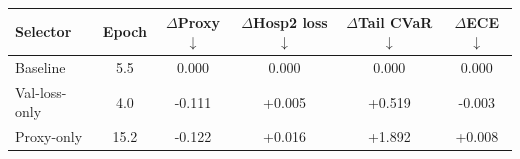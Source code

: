 \begin{tabular}{lccccc}
\toprule
Selector & Epoch & $\Delta$Proxy$\downarrow$ & $\Delta$Hosp2 loss$\downarrow$ & $\Delta$Tail CVaR$\downarrow$ & $\Delta$ECE$\downarrow$ \\
\midrule
Baseline & 5.5 & 0.000 & 0.000 & 0.000 & 0.000 \\
Val-loss-only & 4.0 & -0.111 & +0.005 & +0.519 & -0.003 \\
Proxy-only & 15.2 & -0.122 & +0.016 & +1.892 & +0.008 \\
\bottomrule
\end{tabular}
